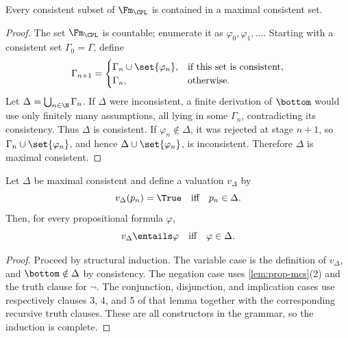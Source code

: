 \begin{lemma}
\label{lem:prop-lindenbaum}
Every consistent subset of \(\Fm_{\CPL}\) is contained in a maximal
consistent set.
\end{lemma}
\begin{proof}
The set \(\Fm_{\CPL}\) is countable; enumerate it as
\(\varphi_0,\varphi_1,\ldots\).  Starting with a consistent set
\(\Gamma_0=\Gamma\), define
\[
 \Gamma_{n+1}=
 \begin{cases}
   \Gamma_n\cup\set{\varphi_n},&
     \text{if this set is consistent},\\
   \Gamma_n,&\text{otherwise}.
 \end{cases}
\]
Let \(\Delta=\bigcup_{n\in\N}\Gamma_n\).  If \(\Delta\) were inconsistent,
a finite derivation of \(\bottom\) would use only finitely many assumptions,
all lying in some \(\Gamma_n\), contradicting its consistency.  Thus
\(\Delta\) is consistent.  If \(\varphi_n\notin\Delta\), it was rejected at
stage \(n+1\), so \(\Gamma_n\cup\set{\varphi_n}\), and hence
\(\Delta\cup\set{\varphi_n}\), is inconsistent.  Therefore \(\Delta\) is
maximal consistent.
\end{proof}

\begin{lemma}
\label{lem:prop-truth}
Let \(\Delta\) be maximal consistent and define a valuation \(v_\Delta\) by
\[
  v_\Delta(p_n)=\True\quad\text{iff}\quad p_n\in\Delta.
\]
Then, for every propositional formula \(\varphi\),
\[
  v_\Delta\entails\varphi
  \quad\text{iff}\quad
  \varphi\in\Delta.
\]
\end{lemma}
\begin{proof}
Proceed by structural induction.  The variable case is the definition of
\(v_\Delta\), and \(\bottom\notin\Delta\) by consistency.  The negation case
uses \cref{lem:prop-mcs}(2) and the truth clause for \(\neg\).  The
conjunction, disjunction, and implication cases use respectively clauses 3,
4, and 5 of that lemma together with the corresponding recursive truth
clauses.  These are all constructors in the grammar, so the induction is
complete.
\end{proof}

